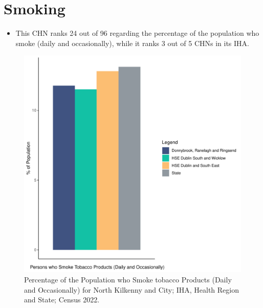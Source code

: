 \documentclass{article}
\begin{document}
\pagebreak

\section{Smoking}\label{sect:Smoking}
\begin{itemize}
\item This CHN ranks  24 out of 96 regarding the percentage of the population who smoke (daily and occasionally), while it ranks   3 out of 5 CHNs in its IHA.
\end{itemize}
\begin{figure}[H]
	\centering
	\includegraphics[width = 120mm]{../figures/SmokingED.pdf}
	\caption{Percentage of the Population who Smoke tobacco Products (Daily and Occasionally) for North Kilkenny and City; IHA, Health Region and State; Census 2022.}
	\label{fig:2ae19629-1a6a-13a3-e055-000000000001}
	\end{figure}
	
\end{document}
